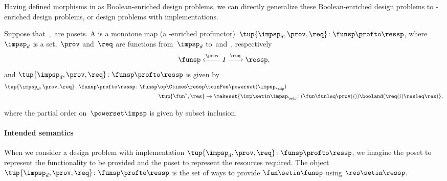 {    Having defined morphisms in \DP as Boolean-enriched design problems, we can directly generalize these Boolean-enriched design problems to \Set-enriched design problems, or design problems with implementations.
    \begin{widepar}
        \begin{definition}
            \label{def:dpwithimp}
            Suppose that~\funsp,~\ressp are posets.
            A \emph{} is a monotone map (a \Set-enriched profunctor)~$\tup{\impsp_d,\prov,\req}\colon \funsp\profto \ressp$, where~$\impsp_d$ is a set,~$\prov$ and~$\req$ are functions from~$\impsp_d$ to~\funsp and~\ressp, respectively
            \begin{equation}
                \funsp \xleftarrow{\prov} I \xrightarrow{\req} \ressp,
            \end{equation}
            and $\tup{\impsp_d,\prov,\req}\colon \funsp\profto \ressp$ is given by
            \begin{equation}
                \begin{aligned}
                    \tup{\impsp_d,\prov,\req}\colon \funsp\profto \ressp \colon \funsp\op \Ctimes \ressp & \toinPos \powerset(\impsp_\adp) \\
                    \tup{\fun^*, \res}                                                                   & \mapsto \makeset{ \imp \setin \impsp_\adp \colon ( \fun \funleq \prov(i)) \booland (\req(i) \resleq \res) },
                \end{aligned}
            \end{equation}

            where the partial order on~$\powerset\impsp$ is given by subset inclusion.
        \end{definition}
    \end{widepar}

    \paragraph{Intended semantics}
    When we consider a design problem with implementation $\tup{\impsp_d, \prov, \req}\colon \funsp\profto \ressp$, we imagine the poset \funsp to represent the functionality to be provided and the poset \ressp to represent the resources required.
    The object $\tup{\impsp_d,\prov,\req}\colon \funsp\profto \ressp$ is the set of ways to provide $\fun\setin \funsp$ using $\res\setin \ressp$.

}
